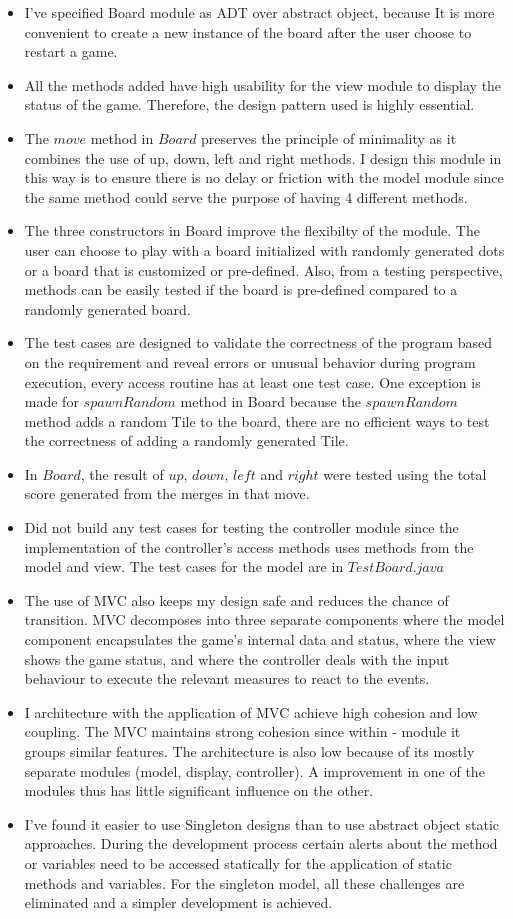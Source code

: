 \documentclass[12pt]{article}
\begin{document}
\begin{itemize}
  \item I've specified Board module as ADT over abstract object, because It is more convenient to create a new instance of the board after the user choose to restart a game.
  \item All the methods added have high usability for the view module to display the status of the game. Therefore, the design pattern used is highly essential.
  \item The $move$ method in $Board$ preserves the principle of minimality as it combines the use of up, down, left and right methods. I design this module in this way is to ensure there is no delay or friction with the model module since the same method could serve the purpose of having 4 different methods.
  \item The three constructors in Board improve the flexibilty of the module. The user can choose to play with a board initialized with randomly generated dots or a board that is customized or pre-defined. Also, from a testing perspective, methods can be easily tested if the board is pre-defined compared to a randomly generated board.
  \item The test cases are designed to validate the correctness of the program based on the requirement and reveal errors or unusual behavior during program execution, every access routine has at least one test case. One exception is made for $spawnRandom$ method in Board because the $spawnRandom$ method adds a random Tile to the board, there are no efficient ways to test the correctness of adding a randomly generated Tile.
  \item In $Board$, the result of $up$, $down$, $left$ and $right$ were tested using the total score generated from the merges in that move.
  \item Did not build any test cases for testing the controller module since the implementation of the controller's access methods uses methods from the model and view. The test cases for the model are in $TestBoard.java$
  \item The use of MVC also keeps my design safe and reduces the chance of transition. MVC decomposes into three separate components where the model component encapsulates the game's internal data and status, where the view shows the game status, and where the controller deals with the input behaviour to execute the relevant measures to react to the events.
  \item I architecture with the application of MVC achieve high cohesion and low coupling. The MVC maintains strong cohesion since within - module it groups similar features. The architecture is also low because of its mostly separate modules (model, display, controller). A improvement in one of the modules thus has little significant influence on the other.
  \item I've found it easier to use Singleton designs than to use abstract object static approaches. During the development process certain alerts about the method or variables need to be accessed statically for the application of static methods and variables. For the singleton model, all these challenges are eliminated and a simpler development is achieved.


\end{itemize}
\end{document}
